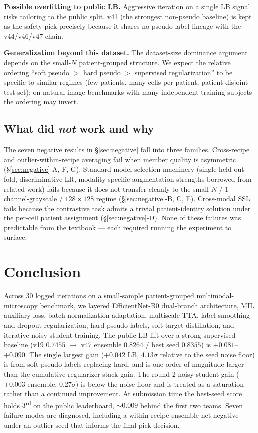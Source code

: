 \documentclass[conference]{IEEEtran}
\begin{document}


\textbf{Possible overfitting to public LB.} Aggressive iteration on a single LB signal risks tailoring to the public split. v41 (the strongest non-pseudo baseline) is kept as the safety pick precisely because it shares no pseudo-label lineage with the v44/v46/v47 chain.

\textbf{Generalization beyond this dataset.} The dataset-size dominance argument depends on the small-$N$ patient-grouped structure. We expect the relative ordering ``soft pseudo $>$ hard pseudo $>$ supervised regularization'' to be specific to similar regimes (few patients, many cells per patient, patient-disjoint test set); on natural-image benchmarks with many independent training subjects the ordering may invert.

\subsection{What did \emph{not} work and why}

The seven negative results in \S\ref{sec:negative} fall into three families. Cross-recipe and outlier-within-recipe averaging fail when member quality is asymmetric (\S\ref{sec:negative}-A, F, G). Standard model-selection machinery (single held-out fold, discriminative LR, modality-specific augmentation strengths borrowed from related work) fails because it does not transfer cleanly to the small-$N$ / 1-channel-grayscale / $128 \times 128$ regime (\S\ref{sec:negative}-B, C, E). Cross-modal SSL fails because the contrastive task admits a trivial patient-identity solution under the per-cell patient assignment (\S\ref{sec:negative}-D). None of these failures was predictable from the textbook --- each required running the experiment to surface.

\section{Conclusion}
\label{sec:conclusion}

Across 30 logged iterations on a small-sample patient-grouped multimodal-microscopy benchmark, we layered EfficientNet-B0 dual-branch architecture, MIL auxiliary loss, batch-normalization adaptation, multiscale TTA, label-smoothing and dropout regularization, hard pseudo-labels, soft-target distillation, and iterative noisy student training. The public-LB lift over a strong supervised baseline (v19 $0.7455$ $\rightarrow$ v47 ensemble $0.8264$ / best seed $0.8355$) is $+0.081$--$+0.090$. The single largest gain ($+0.042$ LB, $4.13\sigma$ relative to the seed noise floor) is from soft pseudo-labels replacing hard, and is one order of magnitude larger than the cumulative regularizer-stack gain. The round-2 noisy-student gain ($+0.003$ ensemble, $0.27\sigma$) is below the noise floor and is treated as a saturation rather than a continued improvement. At submission time the best-seed score holds $3$\textsuperscript{rd} on the public leaderboard, $\sim$$0.009$ behind the first two teams. Seven failure modes are diagnosed, including a within-recipe ensemble net-negative under an outlier seed that informs the final-pick decision.
\end{document}

